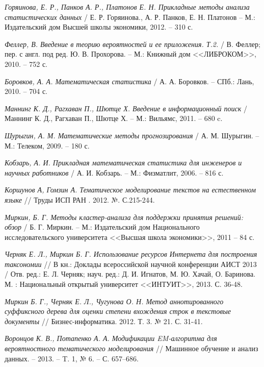 \documentclass[12pt]{report}
\begin{document}
\begin{thebibliography}{99}
\vspace{5mm}

{\it Горяинова, Е. Р., Панков А. Р., Платонов Е. Н. Прикладные методы анализа статистических данных} / Е. Р. Горяинова., А. Р. Панков, Е. Н. Платонов -- М.: Издательский дом Высшей школы экономики, 2012. -- 310 с.

{\it Феллер, В. Введение в теорию вероятностей и ее приложения. Т.2.} /
В. Феллер; пер. с англ. под ред. Ю. В. Прохорова. -- М.:
Книжный дом <<ЛИБРОКОМ>>, 2010. -- 752 с.

{\it Боровков, А. А. Математическая статистика} / А. А. Боровков. -- СПб.: Лань, 2010. -- 704 с.

{\it Маннинг К. Д., Рагхаван П., Шютце Х. Введение в информационный поиск} / Маннинг К. Д., Рагхаван П., Шютце Х. -- М.: Вильямс, 2011. -- 680 c.

{\it Шурыгин, А. М. Математические методы прогнозирования} / А. М. Шурыгин. -- М.: Телеком, 2009. -- 180 с.

{\it Кобзарь, А. И. Прикладная математическая статистика для инженеров и
  научных работников} / А. И. Кобзарь. -- М.: Физматлит, 2006. -- 816 с.

{\it Коршунов А, Гомзин А. Тематическое моделирование текстов на естественном языке} // Труды ИСП РАН . 2012. №. С.215-244.

{\it Миркин, Б. Г. Методы кластер-анализа для поддержки принятия решений: обзор} / Б. Г. Миркин. -- М.: Издательский дом Национального исследовательского университета <<Высшая школа экономики>>, 2011 -- 84 с.

{\it Черняк Е. Л., Миркин Б. Г. Использование ресурсов Интернета для построения таксономии} // В кн.: Доклады всероссийской научной конференции АИСТ 2013 / Отв. ред.: Е. Л. Черняк; науч. ред.: Д. И. Игнатов, М. Ю. Хачай, О. Баринова. М. : Национальный открытый университет <<ИНТУИТ>>, 2013. С. 36-48. 

{\it Миркин Б. Г., Черняк Е. Л., Чугунова О. Н. Метод аннотированного суффиксного дерева для оценки степени вхождения строк в текстовые документы }  // Бизнес-информатика. 2012. Т. 3. № 21. С. 31-41. 

{\it  Воронцов К. В., Потапенко А. А. Модификации EM-алгоритма для вероятностного тематического моделирования } // Машинное обучение и анализ данных. -- 2013. -- T. 1, № 6. -- С. 657–686. 



\end{thebibliography}
\end{document}
